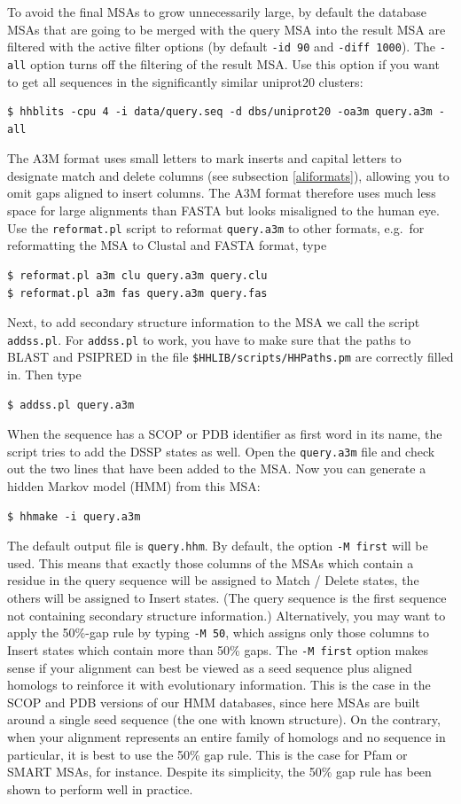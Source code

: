 \documentclass[11pt,a4paper]{article}
\begin{document}
To avoid the final MSAs to grow unnecessarily large, by default the database MSAs that are going to be merged with the query MSA into the result MSA are filtered with the active filter options (by default \verb`-id 90` and \verb`-diff 1000`). The \verb`-all` option turns off the filtering of the result MSA. Use this option if you want to get all sequences in the significantly similar uniprot20 clusters: 
\begin{verbatim}
$ hhblits -cpu 4 -i data/query.seq -d dbs/uniprot20 -oa3m query.a3m -all
\end{verbatim}

The A3M format uses small letters to mark inserts and capital letters to designate match and delete columns (see subsection \ref{aliformats}), allowing you to omit gaps aligned to insert columns. The A3M format therefore uses much less space for large alignments than FASTA but looks misaligned to the human eye. Use the \verb`reformat.pl` script to reformat \verb`query.a3m` to other formats, e.g.\ for reformatting the MSA to Clustal and FASTA format, type
\begin{verbatim}
$ reformat.pl a3m clu query.a3m query.clu
$ reformat.pl a3m fas query.a3m query.fas
\end{verbatim}

Next, to add secondary structure information to the MSA we call the script \verb`addss.pl`. For \verb`addss.pl` to work, you have to make sure that the paths to BLAST and PSIPRED in the file \verb`$HHLIB/scripts/HHPaths.pm` are correctly filled in. Then type
\begin{verbatim}
$ addss.pl query.a3m
\end{verbatim}
When the sequence has a SCOP or PDB identifier as first word in its name, the script tries to add the DSSP states as well. Open the \verb`query.a3m` file and check out the two lines that have been added to the MSA. Now you can generate a hidden Markov model (HMM) from this MSA:
\begin{verbatim}
$ hhmake -i query.a3m
\end{verbatim}
The default output file is \verb`query.hhm`. By default, the option \verb`-M first` will 
be used. This means that exactly those columns of 
the MSAs which contain a residue in the query sequence will be assigned to Match 
/ Delete states, the others will be assigned to Insert states. (The query sequence is 
the first sequence not containing secondary structure information.) Alternatively, you 
may want to apply the 50\%-gap rule by typing \verb`-M 50`, which assigns only those columns 
to Insert states which contain more than 50\% gaps. The \verb`-M first` option makes sense 
if your alignment can best be viewed as a seed sequence plus aligned homologs to 
reinforce it with evolutionary information. This is the case in the SCOP and PDB 
versions of our HMM databases, since here MSAs are built around a single seed 
sequence (the one with known structure). On the contrary, when your alignment 
represents an entire family of homologs and no sequence in particular, it is best to 
use the 50\% gap rule. This is the case for Pfam or SMART MSAs, for instance. 
Despite its simplicity, the 50\% gap rule has been shown to perform well in practice.
\end{document}
